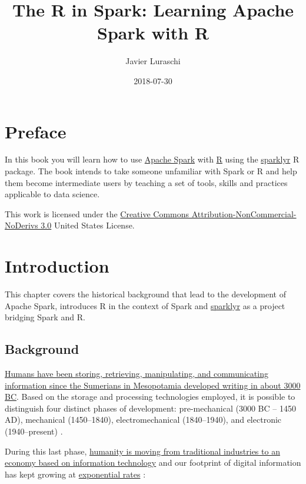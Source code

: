 \documentclass[]{book}
\title{The R in Spark: Learning Apache Spark with R}
\author{Javier Luraschi}
\date{2018-07-30}
\theoremstyle{definition}
\theoremstyle{definition}
\theoremstyle{definition}
\theoremstyle{remark}
\begin{document}
\maketitle

{
\setcounter{tocdepth}{1}
\tableofcontents
}
\hypertarget{preface}{%
\chapter*{Preface}\label{preface}}

In this book you will learn how to use
\href{https://spark.apache.org}{Apache Spark} with
\href{http://www.r-project.org/}{R} using the
\href{https://github.com/rstudio/sparklyr}{sparklyr} R package. The book
intends to take someone unfamiliar with Spark or R and help them become
intermediate users by teaching a set of tools, skills and practices
applicable to data science.

This work is licensed under the
\href{http://creativecommons.org/licenses/by-nc-nd/3.0/us/}{Creative
Commons Attribution-NonCommercial-NoDerivs 3.0} United States License.

\hypertarget{intro}{%
\chapter{Introduction}\label{intro}}

This chapter covers the historical background that lead to the
development of Apache Spark, introduces R in the context of Spark and
\href{https://github.com/rstudio/sparklyr}{sparklyr} as a project
bridging Spark and R.

\hypertarget{background}{%
\section{Background}\label{background}}

\href{https://en.wikipedia.org/wiki/Information_technology}{Humans have
been storing, retrieving, manipulating, and communicating information
since the Sumerians in Mesopotamia developed writing in about 3000 BC}.
Based on the storage and processing technologies employed, it is
possible to distinguish four distinct phases of development:
pre-mechanical (3000 BC -- 1450 AD), mechanical (1450--1840),
electromechanical (1840--1940), and electronic (1940--present)
\citep{information-technology}.

During this last phase,
\href{https://en.wikipedia.org/wiki/Information_Age}{humanity is moving
from traditional industries to an economy based on information
technology} and our footprint of digital information has kept growing at
\protect\hyperlink{storage-capacity}{exponential rates}
\citep{data-revolution}:
\end{document}
